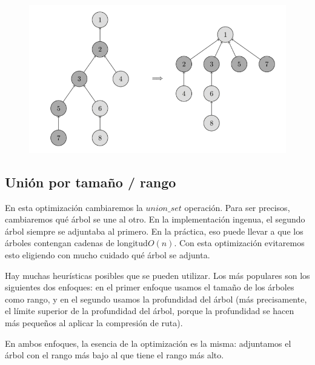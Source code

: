 \begin{figure}[h!]
	\centering
	\includegraphics[width=0.6\linewidth]{img/DSU_path_compression}
	\label{fig:dsuexample2}
\end{figure}

\subsection{Unión por tamaño / rango}

En esta optimización cambiaremos la $union\_set$ operación. Para ser precisos, cambiaremos qué árbol se une al otro. En la implementación ingenua, el segundo árbol siempre se adjuntaba al primero. En la práctica, eso puede llevar a que los árboles contengan cadenas de longitud$O(n)$. Con esta optimización evitaremos esto eligiendo con mucho cuidado qué árbol se adjunta.

Hay muchas heurísticas posibles que se pueden utilizar. Los más populares son los siguientes dos enfoques: en el primer enfoque usamos el tamaño de los árboles como rango, y en el segundo usamos la profundidad del árbol (más precisamente, el límite superior de la profundidad del árbol, porque la profundidad se hacen más pequeños al aplicar la compresión de ruta).

En ambos enfoques, la esencia de la optimización es la misma: adjuntamos el árbol con el rango más bajo al que tiene el rango más alto.


